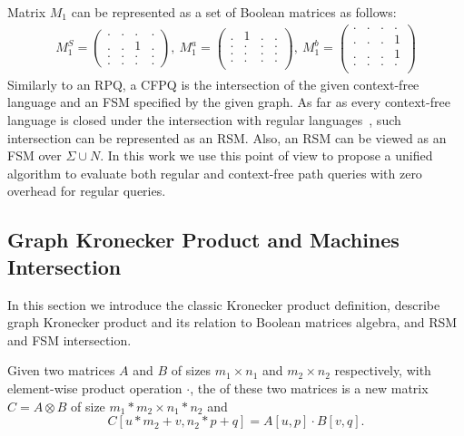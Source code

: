 Matrix $M_1$ can be represented as a set of Boolean matrices as follows:
{\small
\begin{align*}
M_1^S =
\begin{pmatrix}
    . & . & . & .   \\
    . & . & 1 & .   \\
    . & . & . & .   \\
    . & . & . & .
\end{pmatrix},~M_1^a =
\begin{pmatrix}
   . & 1 & . & .   \\
   . & . & . & .   \\
   . & . & . & .   \\
   . & . & . & .   \\
\end{pmatrix},~M_1^b =
\begin{pmatrix}
    . & . & . & .   \\
    . & . & . & 1   \\
    . & . & . & 1   \\
    . & . & . & .   \\
\end{pmatrix}
\end{align*}
}
Similarly to an RPQ, a CFPQ is the intersection of the given context-free language and an FSM specified by the given graph.
As far as every context-free language is closed under the intersection with regular languages~\citep{automata:theory:10.5555/1177300}, such intersection can be represented as an RSM.
Also, an RSM can be viewed as an FSM over $\Sigma \cup N$.
In this work we use this point of view to propose a unified algorithm to evaluate both regular and context-free path queries with zero overhead for regular queries.

\subsection{Graph Kronecker Product and Machines Intersection}

In this section we introduce the classic Kronecker product definition,
describe graph Kronecker product and its relation to Boolean matrices algebra,
and RSM and FSM intersection.

\begin{definition}
Given two matrices $A$ and $B$ of sizes $m_1 \times n_1$ and $m_2 \times n_2$
respectively, with element-wise product operation $\cdot$, the  of these two matrices is a new matrix $C = A \otimes B$ of size $m_1 * m_2 \times n_1 * n_2$ and \[C[u * m_2 + v,n_2 * p + q] = A[u,p] \cdot B[v,q].\]
\end{definition}

